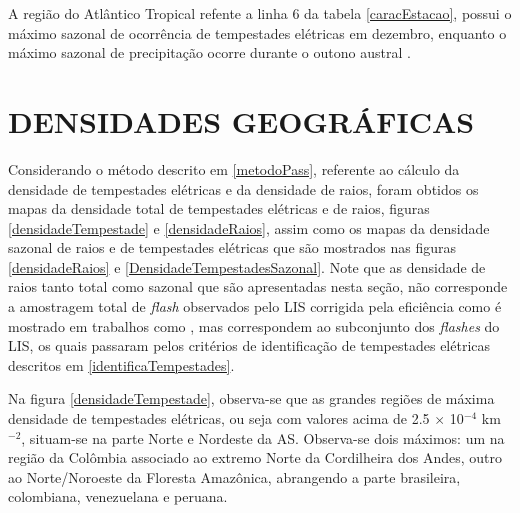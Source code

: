 A região do Atlântico Tropical refente a linha 6 da tabela \ref{caracEstacao}, possui o máximo sazonal de ocorrência de tempestades elétricas em dezembro, enquanto o máximo sazonal de precipitação ocorre durante o outono austral \cite{cusdodioTese}.





\section{DENSIDADES GEOGRÁFICAS}
\label{secaoDensidades}

Considerando o método descrito em \ref{metodoPass}, referente ao cálculo da densidade de tempestades elétricas e da densidade de raios, foram obtidos os mapas da densidade total de tempestades elétricas e de raios, figuras \ref{densidadeTempestade} e \ref{densidadeRaios}, assim como os mapas da densidade sazonal de raios e de tempestades elétricas que são mostrados nas  figuras \ref{densidadeRaios} e \ref{DensidadeTempestadesSazonal}. Note que as densidade de raios  tanto total como sazonal que são apresentadas nesta seção, não corresponde a amostragem total de \textit{flash} observados pelo LIS corrigida pela eficiência como é mostrado em trabalhos como  , mas correspondem ao subconjunto dos \textit{flashes} do LIS, os quais passaram pelos critérios de identificação de tempestades elétricas descritos em \ref{identificaTempestades}.


Na figura \ref{densidadeTempestade}, observa-se que as grandes regiões de máxima densidade de tempestades elétricas, ou seja com valores acima de 2.5 $\times$ 10$^{-4}$ km$^{-2}$, situam-se na parte Norte e Nordeste da AS. Observa-se dois máximos: um na região da Colômbia associado ao extremo Norte da Cordilheira dos Andes, outro ao Norte/Noroeste da Floresta Amazônica, abrangendo a parte brasileira, colombiana, venezuelana e peruana.  

